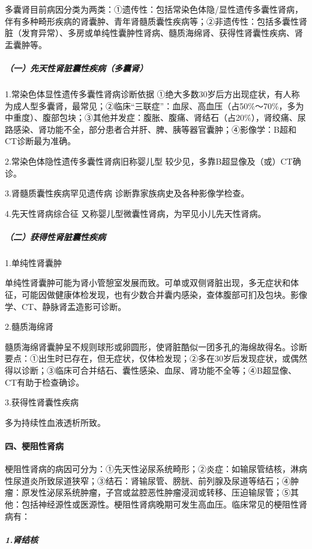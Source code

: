 多囊肾目前病因分类为两类：①遗传性：包括常染色体隐/显性遗传多囊性肾病，伴有多种畸形疾病的肾囊肿、青年肾髓质囊性疾病等；②非遗传性：包括多囊性肾脏（发育异常）、多房或单纯性囊肿性肾病、髓质海绵肾、获得性肾囊性疾病、肾盂囊肿等。

\subparagraph{（一）先天性肾脏囊性疾病（多囊肾）}

1.常染色体显性遗传多囊性肾病诊断依据
①绝大多数30岁后方出现症状，有人称为成人型多囊肾，最常见；②临床“三联症”：血尿、高血压（占50\%～70\%，多为中重度）、腹部包块；③其他并发症：腹胀、腹痛、肾结石（占20\%），肾绞痛、尿路感染、肾功能不全，部分患者合并肝、脾、胰等器官囊肿；④影像学：B超和CT诊断最为准确。

2.常染色体隐性遗传多囊性肾病旧称婴儿型
较少见，多靠B超显像及（或）CT确诊。

3.肾髓质囊性疾病罕见遗传病 诊断靠家族病史及各种影像学检查。

4.先天性肾病综合征 又称婴儿型微囊性肾病，为罕见小儿先天性肾病。

\subparagraph{（二）获得性肾脏囊性疾病}

\hypertarget{text00109.htmlux5cux23CHP12-8-1-1-3-2-1}{}
1.单纯性肾囊肿

单纯性肾囊肿可能为肾小管憩室发展而致。可单或双侧肾脏出现，多无症状和体征，可能因做健康体检发现，也有少数合并囊内感染，查体腹部可扪及包块。影像学、CT、静脉肾盂造影可诊断。

\hypertarget{text00109.htmlux5cux23CHP12-8-1-1-3-2-2}{}
2.髓质海绵肾

髓质海绵肾囊肿呈不规则球形或卵圆形，使肾脏酷似一团多孔的海绵故得名。诊断要点：①出生时已存在，但无症状，仅体检发现；②多在30岁后发现症状，或偶然得以诊断；③临床可合并结石、囊性感染、血尿、肾功能不全等；④B超显像、CT有助于检查确诊。

\hypertarget{text00109.htmlux5cux23CHP12-8-1-1-3-2-3}{}
3.获得性肾囊性疾病

多为持续性血液透析所致。

\paragraph{四、梗阻性肾病}

梗阻性肾病的病因可分为：①先天性泌尿系统畸形；②炎症：如输尿管结核，淋病性尿道炎所致尿道狭窄；③结石：肾输尿管、膀胱、前列腺及尿道等结石；④肿瘤：原发性泌尿系统肿瘤，子宫或盆腔恶性肿瘤浸润或转移、压迫输尿管；⑤其他：包括神经源性或医源性。梗阻性肾病晚期可发生高血压。临床常见的梗阻性肾病有：

\subparagraph{1.肾结核}

